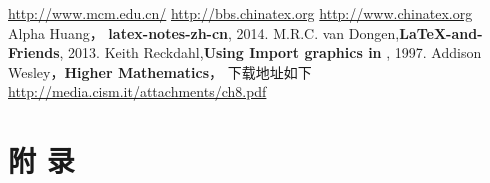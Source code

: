 \documentclass{cumcmart}
\begin{document}
\begin{thebibliography}{10}
 \url{http://www.mcm.edu.cn/}
 \url{http://bbs.chinatex.org}
 \url{http://www.chinatex.org}
 Alpha Huang， \textbf{latex-notes-zh-cn}, 2014.
M.R.C. van Dongen,\textbf{\LaTeX-and-Friends}, 2013.
Keith Reckdahl,\textbf{Using Import graphics in \LaTeXe}, 1997.
Addison Wesley，\textbf{Higher Mathematics}， 下载地址如下\\ \url{http://media.cism.it/attachments/ch8.pdf}
\end{thebibliography}


\newpage
\appendix
\section*{附 \quad 录}
\end{document}
